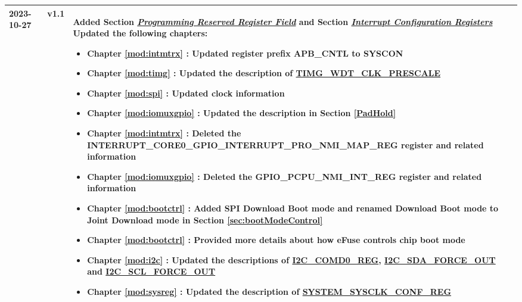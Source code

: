 \begin{longtable}[l]{ | m{2cm} | m{1.5cm} | m{12cm} | }
    2023-10-27 & v1.1 &
     Added Section \hyperref[programming-reserved-field]{\textit{Programming Reserved Register Field}} and Section \hyperref[interrupt-config-registers]{\textit{Interrupt Configuration Registers}} \newline
     Updated the following chapters:
            \begin{itemize}
                \item Chapter \ref{mod:intmtrx} \textit{\nameref{mod:intmtrx}}: Updated register prefix APB\_CNTL to SYSCON %
                \item Chapter \ref{mod:timg} \textit{\nameref{mod:timg}}: Updated the description of \hyperref[fielddesc:TIMGWDTCLKPRESCALE]{TIMG\_WDT\_CLK\_PRESCALE} %
                \item Chapter \ref{mod:spi} \textit{\nameref{mod:spi}}: Updated clock information %
                \item Chapter \ref{mod:iomuxgpio} \textit{\nameref{mod:iomuxgpio}}: Updated the description in Section \ref{PadHold} %
                \item Chapter \ref{mod:intmtrx} \textit{\nameref{mod:intmtrx}}: Deleted the INTERRUPT\_CORE0\_GPIO\_INTERRUPT\_PRO\_NMI\_MAP\_REG register and related information %
                \item Chapter \ref{mod:iomuxgpio} \textit{\nameref{mod:iomuxgpio}}: Deleted the GPIO\_PCPU\_NMI\_INT\_REG register and related information %
                \item Chapter \ref{mod:bootctrl} \textit{\nameref{mod:bootctrl}}: Added SPI Download Boot mode and renamed Download Boot mode to Joint Download mode in Section \ref{sec:bootModeControl} %
                \item Chapter \ref{mod:bootctrl} \textit{\nameref{mod:bootctrl}}: Provided more details about how eFuse controls chip boot mode %
                \item Chapter \ref{mod:i2c} \textit{\nameref{mod:i2c}}: Updated the descriptions of \hyperref[regdesc:I2CCOMD0REG]{I2C\_COMD0\_REG}, \hyperref[fielddesc:I2CSDAFORCEOUT]{I2C\_SDA\_FORCE\_OUT} and \hyperref[fielddesc:I2CSCLFORCEOUT]{I2C\_SCL\_FORCE\_OUT}  %
                \item Chapter \ref{mod:sysreg} \textit{\nameref{mod:sysreg}}: Updated the description of \hyperref[regdesc:SYSTEMSYSCLKCONFREG]{SYSTEM\_SYSCLK\_CONF\_REG} %
            \end{itemize}
     \\\hline

\end{longtable}
